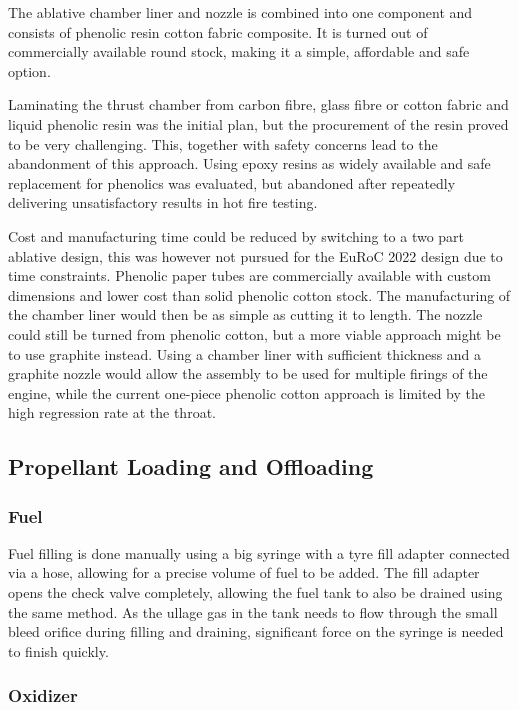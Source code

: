 The ablative chamber liner and nozzle is combined into one component and consists of phenolic resin cotton fabric composite. It is turned out of commercially available round stock, making it a simple, affordable and safe option.

Laminating the thrust chamber from carbon fibre, glass fibre or cotton fabric and liquid phenolic resin was the initial plan, but the procurement of the resin proved to be very challenging. This, together with safety concerns lead to the abandonment of this approach. Using epoxy resins as widely available and safe replacement for phenolics was evaluated, but abandoned after repeatedly delivering unsatisfactory results in hot fire testing.

Cost and manufacturing time could be reduced by switching to a two part ablative design, this was however not pursued for the EuRoC 2022 design due to time constraints. Phenolic paper tubes are commercially available with custom dimensions and lower cost than solid phenolic cotton stock. The manufacturing of the chamber liner would then be as simple as cutting it to length. The nozzle could still be turned from phenolic cotton, but a more viable approach might be to use graphite instead. Using a chamber liner with sufficient thickness and a graphite nozzle would allow the assembly to be used for multiple firings of the engine, while the current one-piece phenolic cotton approach is limited by the high regression rate at the throat.

\subsection{Propellant Loading and Offloading}

\subsubsection{Fuel}

Fuel filling is done manually using a big syringe with a tyre fill adapter connected via a hose, allowing for a precise volume of fuel to be added. The fill adapter opens the check valve completely, allowing the fuel tank to also be drained using the same method. As the ullage gas in the tank needs to flow through the small bleed orifice during filling and draining, significant force on the syringe is needed to finish quickly.

\subsubsection{Oxidizer}\label{sec:sysarch_prop_oxLoad}

